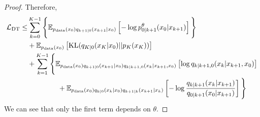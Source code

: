 \documentclass{article}
\begin{document}
\begin{proof}
Therefore,
\begin{align}
    \mathcal{L}_{\textup{DT}} \leq& \sum_{k=0}^{K-1} \Bigg\{ \mathbb{E}_{p_{\textup{data}}(x_0) q_{k+1|0}(x_{k+1} | x_0)} \left[ - \log p_{0|k+1}^\theta(x_0 | x_{k+1}) \right]\Bigg\} \\
    &+ \mathbb{E}_{p_{\textup{data}}(x_0)} \left[ \text{KL} ( q_{K|0}(x_K | x_0) || p_K(x_K) ) \right] \\
    &+ \sum_{k=1}^{K-1} \Bigg \{ \mathbb{E}_{p_{\textup{data}}(x_0) q_{k+1|0}(x_{k+1} | x_0) q_{k|k+1, 0}(x_{k} | x_{k+1}, x_0)} \left[ \log q_{k|k+1, 0}(x_{k} | x_{k+1}, x_0) \right] \\
    &\hspace{1.5cm}+ \mathbb{E}_{p_{\textup{data}}(x_0) q_{k|0}(x_{k} | x_0) q_{k+1|k}(x_{k+1} | x_{k})} \left[ - \log \frac{ q_{k|k+1}(x_{k}|x_{k+1})   }{ q_{0|k+1}(x_0 | x_{k+1})   }\right] \Bigg\}
\end{align}
We can see that only the first term depends on $\theta$.
\end{proof}
\end{document}
